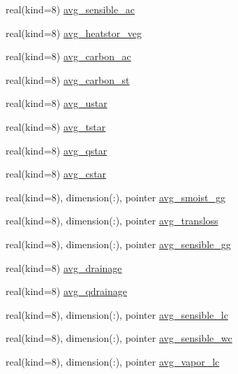 \begin{DoxyCompactItemize}
\item 
real(kind=8) \hyperlink{structrk4__coms_1_1rk4patchtype_a39fbc218ce0bd7904ce27c80b435f4ee}{avg\+\_\+sensible\+\_\+ac}
\item 
real(kind=8) \hyperlink{structrk4__coms_1_1rk4patchtype_ae1b42a8ea90797190a0c9c457e7234f5}{avg\+\_\+heatstor\+\_\+veg}
\item 
real(kind=8) \hyperlink{structrk4__coms_1_1rk4patchtype_ad6e6550176dfb89feebfd941165e2449}{avg\+\_\+carbon\+\_\+ac}
\item 
real(kind=8) \hyperlink{structrk4__coms_1_1rk4patchtype_a410ab0421800f82d20802b590159b4d2}{avg\+\_\+carbon\+\_\+st}
\item 
real(kind=8) \hyperlink{structrk4__coms_1_1rk4patchtype_ac625263218c21df43284e09fa81f7bd7}{avg\+\_\+ustar}
\item 
real(kind=8) \hyperlink{structrk4__coms_1_1rk4patchtype_a1744620bbd22622e4242381ac4a2f090}{avg\+\_\+tstar}
\item 
real(kind=8) \hyperlink{structrk4__coms_1_1rk4patchtype_ab76b9f2638d3d15f8a111beb65088bcd}{avg\+\_\+qstar}
\item 
real(kind=8) \hyperlink{structrk4__coms_1_1rk4patchtype_adf42c712fb13a78da316ca3acbff0910}{avg\+\_\+cstar}
\item 
real(kind=8), dimension(\+:), pointer \hyperlink{structrk4__coms_1_1rk4patchtype_ab560e2cc8ea1d10fdd457fa4a642b84c}{avg\+\_\+smoist\+\_\+gg}
\item 
real(kind=8), dimension(\+:), pointer \hyperlink{structrk4__coms_1_1rk4patchtype_ac216083a0908705ed4765481944cd5fb}{avg\+\_\+transloss}
\item 
real(kind=8), dimension(\+:), pointer \hyperlink{structrk4__coms_1_1rk4patchtype_ac95122199d11422b10a8f3fc61334e0a}{avg\+\_\+sensible\+\_\+gg}
\item 
real(kind=8) \hyperlink{structrk4__coms_1_1rk4patchtype_a30dc13f12f5121cef922c5648964ae43}{avg\+\_\+drainage}
\item 
real(kind=8) \hyperlink{structrk4__coms_1_1rk4patchtype_a7554a3b598ac64fe8f649aa35bc38747}{avg\+\_\+qdrainage}
\item 
real(kind=8), dimension(\+:), pointer \hyperlink{structrk4__coms_1_1rk4patchtype_a6127b66712ffc6c15675275cafd78c8d}{avg\+\_\+sensible\+\_\+lc}
\item 
real(kind=8), dimension(\+:), pointer \hyperlink{structrk4__coms_1_1rk4patchtype_a7b82112214dee9a3c72043a024acb538}{avg\+\_\+sensible\+\_\+wc}
\item 
real(kind=8), dimension(\+:), pointer \hyperlink{structrk4__coms_1_1rk4patchtype_acea041337343e625db3c1d6fce434694}{avg\+\_\+vapor\+\_\+lc}

\end{DoxyCompactItemize}
